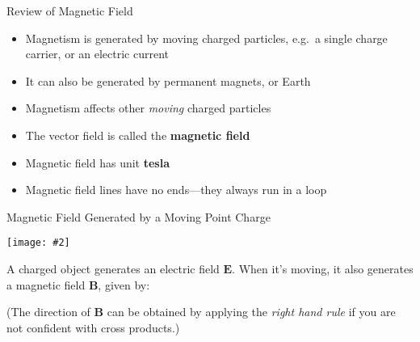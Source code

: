 \documentclass[12pt,aspectratio=169]{beamer}
\newcommand{\pic}[2]{\texttt{[image: \#2]}}
\newcommand{\mb}[1]{\mathbf{#1}}
\newcommand{\eq}[2]{\vspace{#1}{\Large\begin{displaymath}#2\end{displaymath}}}
\begin{document}
\begin{frame}{Review of Magnetic Field}
  \begin{itemize}
  \item Magnetism is generated by moving charged particles, e.g.\ a single
    charge carrier, or an electric current
  \item It can also be generated by permanent magnets, or Earth
  \item Magnetism affects other \emph{moving} charged particles
  \item The vector field is called the \textbf{magnetic field}
  \item Magnetic field has unit \textbf{tesla}
  \item Magnetic field lines have no ends---they always run in a loop
  \end{itemize}
\end{frame}



\begin{frame}{Magnetic Field Generated by a Moving Point Charge}
  \begin{center}
    \pic{.35}{pointchargeB}
  \end{center}
  A charged object generates an electric field $\mb{E}$. When it's moving, it
  also generates a magnetic field $\mb{B}$, given by:

  \eq{-.3in}{
    \boxed{\mb{B}=\frac{\mu_0}{4\pi}\frac{q\mb{v}\times\hat{\mb{r}}}{r^2}}
  }

  \vspace{-.1in}(The direction of $\mb{B}$ can be obtained by applying the
  \emph{right hand rule} if you are not confident with cross products.)
\end{frame}
\end{document}
